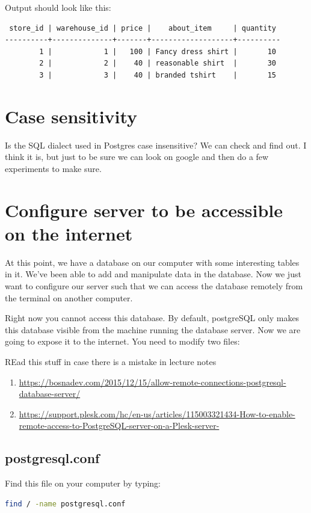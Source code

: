 \documentclass[12pt,a4paper]{article}
\begin{document}
Output should look like this:

\begin{verbatim}
 store_id | warehouse_id | price |    about_item     | quantity 
----------+--------------+-------+-------------------+----------
        1 |            1 |   100 | Fancy dress shirt |       10
        2 |            2 |    40 | reasonable shirt  |       30
        3 |            3 |    40 | branded tshirt    |       15
\end{verbatim}

\section{Case sensitivity}
Is the SQL dialect used in Postgres case insensitive? We can check and find out.
I think it is, but just to be sure we can look on google and then do a few
experiments to make sure.

\section{ Configure server to be accessible on the internet }
At this point, we have a database on our computer with some interesting tables in it. We've been able to add and manipulate data in the database. Now we just want to configure our server such that we can access the database remotely from the terminal on another computer.

Right now you cannot access this database. By default, postgreSQL only makes this database visible from the machine running the database server. Now we are going to expose it to the internet. You need to modify two files:

REad this stuff in case there is a mistake in lecture notes
\begin{enumerate}
\item \url{https://bosnadev.com/2015/12/15/allow-remote-connections-postgresql-database-server/}
\item \url{https://support.plesk.com/hc/en-us/articles/115003321434-How-to-enable-remote-access-to-PostgreSQL-server-on-a-Plesk-server-}
\end{enumerate}

\subsection{postgresql.conf}
Find this file on your computer by typing:

\begin{lstlisting}[language=bash]
find / -name postgresql.conf
\end{lstlisting}
\end{document}
